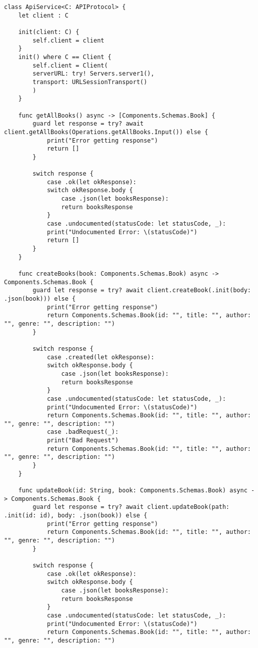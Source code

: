\begin{lstlisting}[caption=ApiService file]
class ApiService<C: APIProtocol> {
    let client : C
    
    init(client: C) {
        self.client = client
    }
    init() where C == Client {
        self.client = Client(
        serverURL: try! Servers.server1(),
        transport: URLSessionTransport()
        )
    }
    
    func getAllBooks() async -> [Components.Schemas.Book] {
        guard let response = try? await client.getAllBooks(Operations.getAllBooks.Input()) else {
            print("Error getting response")
            return []
        }
        
        switch response {
            case .ok(let okResponse):
            switch okResponse.body {
                case .json(let booksResponse):
                return booksResponse
            }
            case .undocumented(statusCode: let statusCode, _):
            print("Undocumented Error: \(statusCode)")
            return []
        }
    }
    
    func createBooks(book: Components.Schemas.Book) async -> Components.Schemas.Book {
        guard let response = try? await client.createBook(.init(body: .json(book))) else {
            print("Error getting response")
            return Components.Schemas.Book(id: "", title: "", author: "", genre: "", description: "")
        }
        
        switch response {
            case .created(let okResponse):
            switch okResponse.body {
                case .json(let booksResponse):
                return booksResponse
            }
            case .undocumented(statusCode: let statusCode, _):
            print("Undocumented Error: \(statusCode)")
            return Components.Schemas.Book(id: "", title: "", author: "", genre: "", description: "")
            case .badRequest(_):
            print("Bad Request")
            return Components.Schemas.Book(id: "", title: "", author: "", genre: "", description: "")
        }
    }
    
    func updateBook(id: String, book: Components.Schemas.Book) async -> Components.Schemas.Book {
        guard let response = try? await client.updateBook(path: .init(id: id), body: .json(book)) else {
            print("Error getting response")
            return Components.Schemas.Book(id: "", title: "", author: "", genre: "", description: "")
        }
        
        switch response {
            case .ok(let okResponse):
            switch okResponse.body {
                case .json(let booksResponse):
                return booksResponse
            }
            case .undocumented(statusCode: let statusCode, _):
            print("Undocumented Error: \(statusCode)")
            return Components.Schemas.Book(id: "", title: "", author: "", genre: "", description: "")
            

\end{lstlisting}
